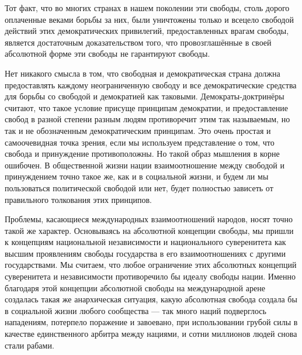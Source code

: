 Тот факт, что во многих странах в нашем поколении эти свободы, столь дорого оплаченные веками борьбы за них, были уничтожены только и всецело свободой действий этих демократических привилегий, предоставленных врагам свободы, является достаточным доказательством того, что провозглашённые в своей абсолютной форме эти свободы не гарантируют свободы.

Нет никакого смысла в том, что свободная и демократическая страна должна предоставлять каждому неограниченную свободу и все демократические средства для борьбы со свободой и демократией как таковыми. Демократы-доктринёры считают, что такое условие присуще принципам демократии, и предоставление свобод в разной степени разным людям противоречит этим так называемым, но так и не обозначенным демократическим принципам. Это очень простая и самоочевидная точка зрения, если мы используем представление о том, что свобода и принуждение противоположны. Но такой образ мышления в корне ошибочен. В общественной жизни нации взаимоотношение между свободой и принуждением точно такое же, как и в социальной жизни, и будем ли мы пользоваться политической свободой или нет, будет полностью зависеть от правильного толкования этих принципов.
 
Проблемы, касающиеся международных взаимоотношений народов, носят точно такой же характер. Основываясь на абсолютной концепции свободы, мы пришли к концепциям национальной независимости и национального суверенитета как высшим проявлениям свободы государства в его взаимоотношениях с другими государствами. Мы считаем, что любое ограничение этих абсолютных концепций суверенитета и независимости противоречило бы идеалу свободы нации. Именно благодаря этой концепции абсолютной свободы на международной арене создалась такая же анархическая ситуация, какую абсолютная свобода создала бы в социальной жизни любого сообщества — так много наций подверглось нападениям, потерпело поражение и завоевано, при использовании грубой силы в качестве единственного арбитра между нациями, и сотни миллионов людей снова стали рабами.
